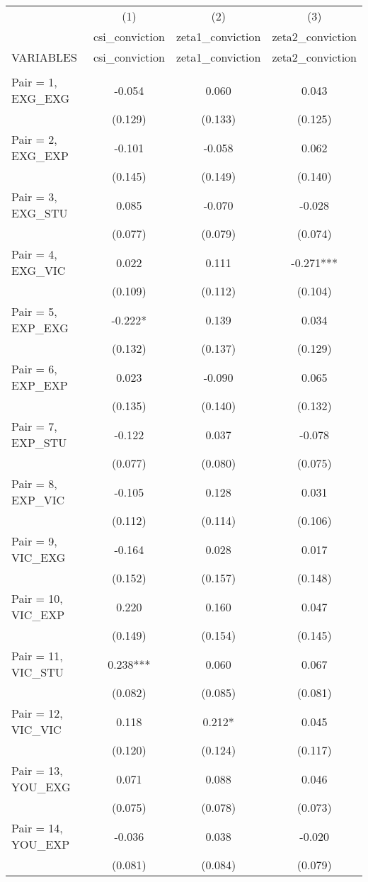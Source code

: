 \documentclass[]{article}
\begin{document}
\begin{tabular}{lccc} \hline
 & (1) & (2) & (3) \\
 & csi\_conviction & zeta1\_conviction & zeta2\_conviction \\
VARIABLES & csi\_conviction & zeta1\_conviction & zeta2\_conviction \\ \hline
 &  &  &  \\
Pair = 1, EXG\_EXG & -0.054 & 0.060 & 0.043 \\
 & (0.129) & (0.133) & (0.125) \\
Pair = 2, EXG\_EXP & -0.101 & -0.058 & 0.062 \\
 & (0.145) & (0.149) & (0.140) \\
Pair = 3, EXG\_STU & 0.085 & -0.070 & -0.028 \\
 & (0.077) & (0.079) & (0.074) \\
Pair = 4, EXG\_VIC & 0.022 & 0.111 & -0.271*** \\
 & (0.109) & (0.112) & (0.104) \\
Pair = 5, EXP\_EXG & -0.222* & 0.139 & 0.034 \\
 & (0.132) & (0.137) & (0.129) \\
Pair = 6, EXP\_EXP & 0.023 & -0.090 & 0.065 \\
 & (0.135) & (0.140) & (0.132) \\
Pair = 7, EXP\_STU & -0.122 & 0.037 & -0.078 \\
 & (0.077) & (0.080) & (0.075) \\
Pair = 8, EXP\_VIC & -0.105 & 0.128 & 0.031 \\
 & (0.112) & (0.114) & (0.106) \\
Pair = 9, VIC\_EXG & -0.164 & 0.028 & 0.017 \\
 & (0.152) & (0.157) & (0.148) \\
Pair = 10, VIC\_EXP & 0.220 & 0.160 & 0.047 \\
 & (0.149) & (0.154) & (0.145) \\
Pair = 11, VIC\_STU & 0.238*** & 0.060 & 0.067 \\
 & (0.082) & (0.085) & (0.081) \\
Pair = 12, VIC\_VIC & 0.118 & 0.212* & 0.045 \\
 & (0.120) & (0.124) & (0.117) \\
Pair = 13, YOU\_EXG & 0.071 & 0.088 & 0.046 \\
 & (0.075) & (0.078) & (0.073) \\
Pair = 14, YOU\_EXP & -0.036 & 0.038 & -0.020 \\
 & (0.081) & (0.084) & (0.079) \\

\end{tabular}
\end{document}
